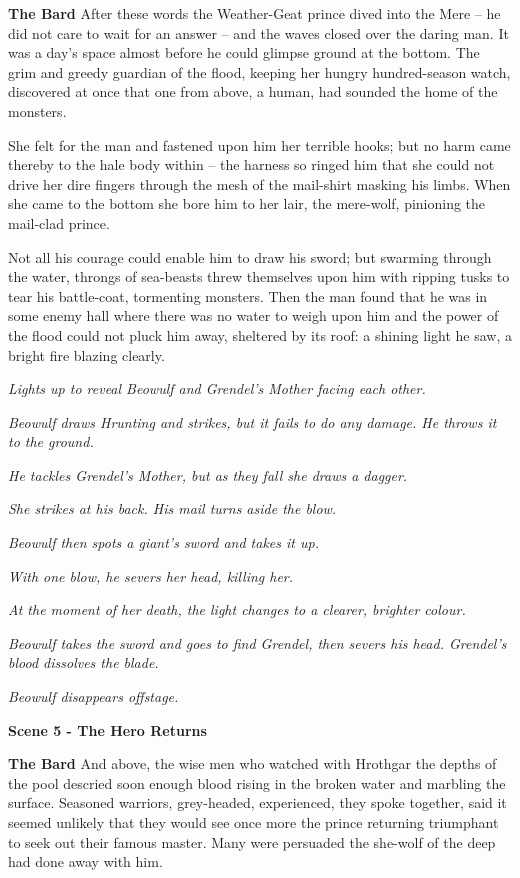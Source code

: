 \documentclass[a4paper]{article}
\begin{document}
{\textbf{The Bard} After these words the Weather-Geat prince
dived into the Mere – he did not care
to wait for an answer – and the waves closed over
the daring man. It was a day’s space almost
before he could glimpse ground at the bottom.
The grim and greedy guardian of the flood,
keeping her hungry hundred-season watch,
discovered at once that one from above,
a human, had sounded the home of the monsters.

She felt for the man and fastened upon him
her terrible hooks; but no harm came thereby
to the hale body within – the harness so ringed him
that she could not drive her dire fingers
through the mesh of the mail-shirt masking his limbs.
When she came to the bottom she bore him to her lair,
the mere-wolf, pinioning the mail-clad prince.

Not all his courage could enable him
to draw his sword; but swarming through the water,
throngs of sea-beasts threw themselves upon him
with ripping tusks to tear his battle-coat,
tormenting monsters. Then the man found
that he was in some enemy hall
where there was no water to weigh upon him
and the power of the flood could not pluck him away,
sheltered by its roof: a shining light he saw,
a bright fire blazing clearly.

\centerline{\textit{Lights up to reveal Beowulf and Grendel's Mother facing each other.}}

\centerline{\textit{Beowulf draws Hrunting and strikes, but it fails to do any damage. He throws it to the ground.}}
\centerline{\textit{He tackles Grendel's Mother, but as they fall she draws a dagger.}}
\centerline{\textit{She strikes at his back. His mail turns aside the blow.}}
\centerline{\textit{Beowulf then spots a giant's sword and takes it up.}}
\centerline{\textit{With one blow, he severs her head, killing her.}}

\centerline{\textit{At the moment of her death, the light changes to a clearer, brighter colour.}}
\centerline{\textit{Beowulf takes the sword and goes to find Grendel, then severs his head. Grendel's blood dissolves the blade.}}

\centerline{\textit{Beowulf disappears offstage.}}
\centerline{\textbf{Scene 5 - The Hero Returns}}

\textbf{The Bard} And above, the wise men who watched with Hrothgar
the depths of the pool descried soon enough
blood rising in the broken water
and marbling the surface. Seasoned warriors,
grey-headed, experienced, they spoke together,
said it seemed unlikely that they would see once more
the prince returning triumphant to seek out
their famous master. Many were persuaded
the she-wolf of the deep had done away with him.

}
\end{document}
